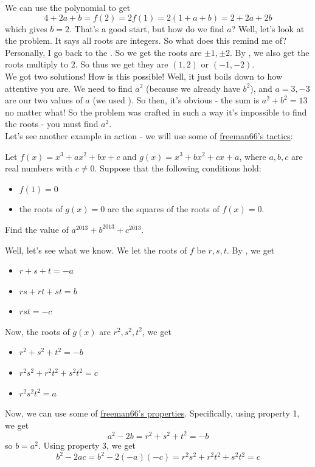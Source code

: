 \documentclass[11pt,titlepage]{scrartcl}
\begin{document}
We can use the polynomial to get
\[4+2a+b=f(2)=2f(1)=2(1+a+b)=2+2a+2b\]
which gives $b=2$. That's a good start, but how do we find $a$? Well, let's look at the problem. It says all roots are integers. So what does this remind me of? Personally, I go back to the . So we get the roots are $\pm 1,\pm 2$. By , we also get the roots multiply to $2$. So thus we get they are $(1,2)$ or $(-1,-2)$.\\[2\baselineskip]
We got two solutions! How is this possible! Well, it just boils down to how attentive you are. We need to find $a^2$ (because we already have $b^2$), and $a=3,-3$ are our two values of $a$ (we used ). So then, it's obvious - the sum is $a^2+b^2=\boxed{13}$ no matter what! So the problem was crafted in such a way it's impossible to find the roots - you must find $a^2$.\\[2\baselineskip]
Let's see another example in action - we will use some of \hyperlink{freelist}{freeman66's tactics}:
\begin{example}
Let $f(x)=x^3+ax^2+bx+c$ and $g(x)=x^3+bx^2+cx+a$, where $a,b,c$ are real numbers with $c\not=0$. Suppose that the following conditions hold:
\begin{itemize}
    \item $f(1)=0$
    \item the roots of $g(x)=0$ are the squares of the roots of $f(x)=0$.
\end{itemize}
Find the value of $a^{2013}+b^{2013}+c^{2013}$.
\end{example}
Well, let's see what we know. We let the roots of $f$ be $r,s,t$. By , we get
\begin{itemize}
    \item $r+s+t=-a$
    \item $rs+rt+st=b$
    \item $rst=-c$
\end{itemize}
Now, the roots of $g(x)$ are $r^2,s^2,t^2$, we get
\begin{itemize}
    \item $r^2+s^2+t^2=-b$
    \item $r^2s^2+r^2t^2+s^2t^2=c$
    \item $r^2s^2t^2=a$
\end{itemize}
Now, we can use some of \hyperlink{freelist}{freeman66's properties}. Specifically, using property 1, we get
\[a^2-2b=r^2+s^2+t^2=-b\]
so $b=a^2$. Using property 3, we get
\[b^2-2ac=b^2-2(-a)(-c)=r^2s^2+r^2t^2+s^2t^2=c\]
\end{document}
